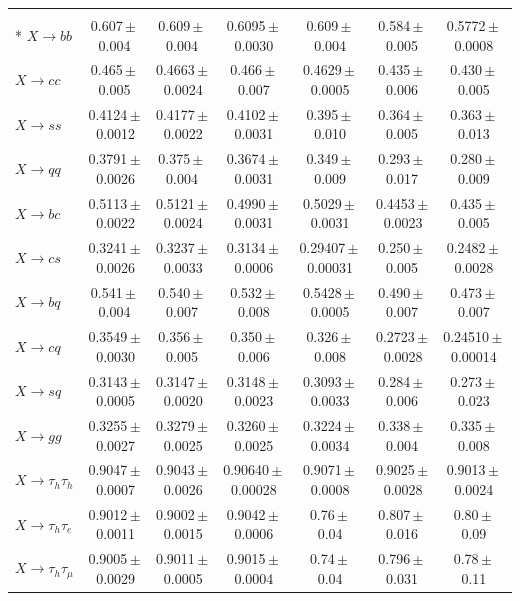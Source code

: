\begin{landscape}
{\begin{longtable}{@{\extracolsep{\fill}}lcccccc@{}}
\midrule
\endhead
\bottomrule
\endlastfoot
\multicolumn{7}{@{}l}{\textit{linear probe on the frozen features}} \\*
$X\to bb$ & 0.607\,$\pm$\,0.004 & 0.609\,$\pm$\,0.004 & 0.6095\,$\pm$\,0.0030 & 0.609\,$\pm$\,0.004 & 0.584\,$\pm$\,0.005 & 0.5772\,$\pm$\,0.0008 \\
$X\to cc$ & 0.465\,$\pm$\,0.005 & 0.4663\,$\pm$\,0.0024 & 0.466\,$\pm$\,0.007 & 0.4629\,$\pm$\,0.0005 & 0.435\,$\pm$\,0.006 & 0.430\,$\pm$\,0.005 \\
$X\to ss$ & 0.4124\,$\pm$\,0.0012 & 0.4177\,$\pm$\,0.0022 & 0.4102\,$\pm$\,0.0031 & 0.395\,$\pm$\,0.010 & 0.364\,$\pm$\,0.005 & 0.363\,$\pm$\,0.013 \\
$X\to qq$ & 0.3791\,$\pm$\,0.0026 & 0.375\,$\pm$\,0.004 & 0.3674\,$\pm$\,0.0031 & 0.349\,$\pm$\,0.009 & 0.293\,$\pm$\,0.017 & 0.280\,$\pm$\,0.009 \\
$X\to bc$ & 0.5113\,$\pm$\,0.0022 & 0.5121\,$\pm$\,0.0024 & 0.4990\,$\pm$\,0.0031 & 0.5029\,$\pm$\,0.0031 & 0.4453\,$\pm$\,0.0023 & 0.435\,$\pm$\,0.005 \\
$X\to cs$ & 0.3241\,$\pm$\,0.0026 & 0.3237\,$\pm$\,0.0033 & 0.3134\,$\pm$\,0.0006 & 0.29407\,$\pm$\,0.00031 & 0.250\,$\pm$\,0.005 & 0.2482\,$\pm$\,0.0028 \\
$X\to bq$ & 0.541\,$\pm$\,0.004 & 0.540\,$\pm$\,0.007 & 0.532\,$\pm$\,0.008 & 0.5428\,$\pm$\,0.0005 & 0.490\,$\pm$\,0.007 & 0.473\,$\pm$\,0.007 \\
$X\to cq$ & 0.3549\,$\pm$\,0.0030 & 0.356\,$\pm$\,0.005 & 0.350\,$\pm$\,0.006 & 0.326\,$\pm$\,0.008 & 0.2723\,$\pm$\,0.0028 & 0.24510\,$\pm$\,0.00014 \\
$X\to sq$ & 0.3143\,$\pm$\,0.0005 & 0.3147\,$\pm$\,0.0020 & 0.3148\,$\pm$\,0.0023 & 0.3093\,$\pm$\,0.0033 & 0.284\,$\pm$\,0.006 & 0.273\,$\pm$\,0.023 \\
$X\to gg$ & 0.3255\,$\pm$\,0.0027 & 0.3279\,$\pm$\,0.0025 & 0.3260\,$\pm$\,0.0025 & 0.3224\,$\pm$\,0.0034 & 0.338\,$\pm$\,0.004 & 0.335\,$\pm$\,0.008 \\
\midrule
$X\to \tau_h\tau_h$ & 0.9047\,$\pm$\,0.0007 & 0.9043\,$\pm$\,0.0026 & 0.90640\,$\pm$\,0.00028 & 0.9071\,$\pm$\,0.0008 & 0.9025\,$\pm$\,0.0028 & 0.9013\,$\pm$\,0.0024 \\
\midrule
$X\to \tau_h\tau_e$ & 0.9012\,$\pm$\,0.0011 & 0.9002\,$\pm$\,0.0015 & 0.9042\,$\pm$\,0.0006 & 0.76\,$\pm$\,0.04 & 0.807\,$\pm$\,0.016 & 0.80\,$\pm$\,0.09 \\
$X\to \tau_h\tau_\mu$ & 0.9005\,$\pm$\,0.0029 & 0.9011\,$\pm$\,0.0005 & 0.9015\,$\pm$\,0.0004 & 0.74\,$\pm$\,0.04 & 0.796\,$\pm$\,0.031 & 0.78\,$\pm$\,0.11 \\

\end{longtable}}
\end{landscape}
